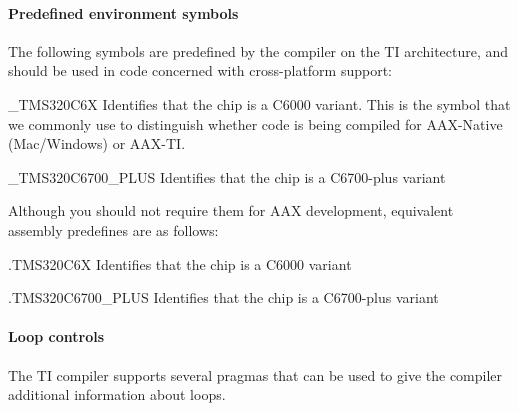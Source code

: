 \hypertarget{a00832_subsubsection__predefined_environment_symbols_}{}\paragraph{Predefined environment symbols}\label{a00832_subsubsection__predefined_environment_symbols_}
 The following symbols are predefined by the compiler on the TI architecture, and should be used in code concerned with cross-\/platform support\+:


\begin{DoxyItemize}
\item {\ttfamily \+\_\+\+T\+M\+S320\+C6X} Identifies that the chip is a C6000 variant. This is the symbol that we commonly use to distinguish whether code is being compiled for A\+A\+X-\/\+Native (Mac/\+Windows) or A\+A\+X-\/\+TI. 
\item {\ttfamily \+\_\+\+T\+M\+S320\+C6700\+\_\+\+P\+L\+US} Identifies that the chip is a C6700-\/plus variant  
\end{DoxyItemize}

Although you should not require them for A\+AX development, equivalent assembly predefines are as follows\+:


\begin{DoxyItemize}
\item {\ttfamily .T\+M\+S320\+C6X} Identifies that the chip is a C6000 variant  
\item {\ttfamily .T\+M\+S320\+C6700\+\_\+\+P\+L\+US} Identifies that the chip is a C6700-\/plus variant 
\end{DoxyItemize}

\hypertarget{a00832_subsubsection__loop_controls_}{}\paragraph{Loop controls}\label{a00832_subsubsection__loop_controls_}
 The TI compiler supports several pragmas that can be used to give the compiler additional information about loops.


